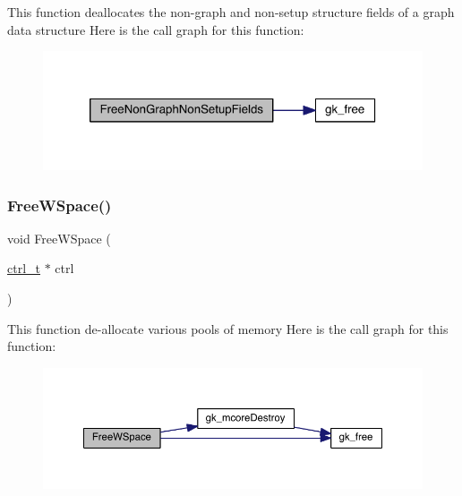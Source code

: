 This function deallocates the non-\/graph and non-\/setup structure fields of a graph data structure Here is the call graph for this function\+:\nopagebreak
\begin{figure}[H]
\begin{center}
\leavevmode
\includegraphics[width=320pt]{a00951_a7f1865a64a8a13def4eacf3d253f970a_cgraph}
\end{center}
\end{figure}
\mbox{\label{a00951_aeccd2c625e3a6157693c00da70a8ded4}} 
\subsubsection{\texorpdfstring{Free\+W\+Space()}{FreeWSpace()}}
{\footnotesize\ttfamily void Free\+W\+Space (\begin{DoxyParamCaption}\item[{\hyperlink{a00742}{ctrl\+\_\+t} $\ast$}]{ctrl }\end{DoxyParamCaption})}

This function de-\/allocate various pools of memory Here is the call graph for this function\+:\nopagebreak
\begin{figure}[H]
\begin{center}
\leavevmode
\includegraphics[width=350pt]{a00951_aeccd2c625e3a6157693c00da70a8ded4_cgraph}
\end{center}
\end{figure}
\mbox{\label{a00951_afa2c79e0aa0b46d0bac3abe5e6593575}} 
